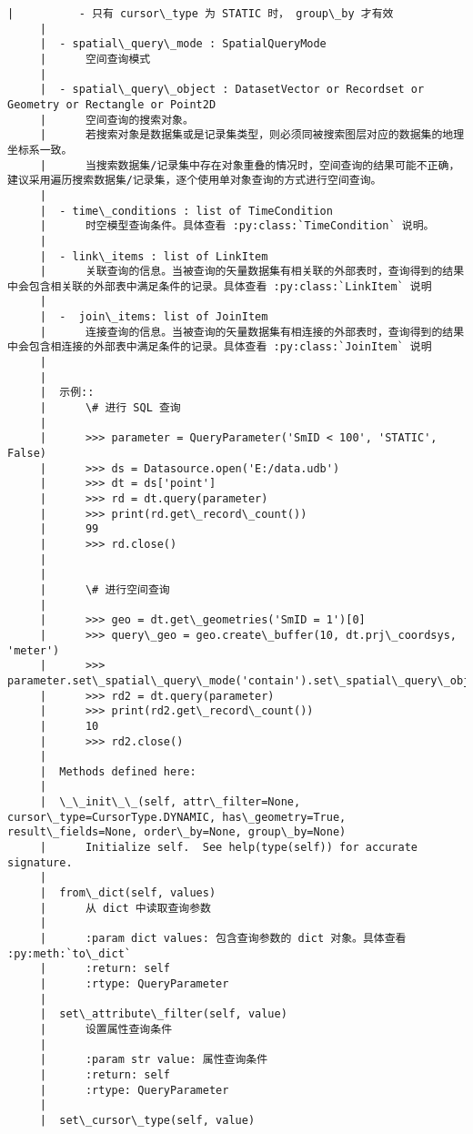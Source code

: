 \documentclass[11pt]{article}
\begin{document}
\begin{Verbatim}[commandchars=\\\{\}]
     |          - 只有 cursor\_type 为 STATIC 时， group\_by 才有效
     |  
     |  - spatial\_query\_mode : SpatialQueryMode
     |      空间查询模式
     |  
     |  - spatial\_query\_object : DatasetVector or Recordset or Geometry or Rectangle or Point2D
     |      空间查询的搜索对象。
     |      若搜索对象是数据集或是记录集类型，则必须同被搜索图层对应的数据集的地理坐标系一致。
     |      当搜索数据集/记录集中存在对象重叠的情况时，空间查询的结果可能不正确，建议采用遍历搜索数据集/记录集，逐个使用单对象查询的方式进行空间查询。
     |  
     |  - time\_conditions : list of TimeCondition
     |      时空模型查询条件。具体查看 :py:class:`TimeCondition` 说明。
     |  
     |  - link\_items : list of LinkItem
     |      关联查询的信息。当被查询的矢量数据集有相关联的外部表时，查询得到的结果中会包含相关联的外部表中满足条件的记录。具体查看 :py:class:`LinkItem` 说明
     |  
     |  -  join\_items: list of JoinItem
     |      连接查询的信息。当被查询的矢量数据集有相连接的外部表时，查询得到的结果中会包含相连接的外部表中满足条件的记录。具体查看 :py:class:`JoinItem` 说明
     |  
     |  
     |  示例::
     |      \# 进行 SQL 查询
     |  
     |      >>> parameter = QueryParameter('SmID < 100', 'STATIC', False)
     |      >>> ds = Datasource.open('E:/data.udb')
     |      >>> dt = ds['point']
     |      >>> rd = dt.query(parameter)
     |      >>> print(rd.get\_record\_count())
     |      99
     |      >>> rd.close()
     |  
     |  
     |      \# 进行空间查询
     |  
     |      >>> geo = dt.get\_geometries('SmID = 1')[0]
     |      >>> query\_geo = geo.create\_buffer(10, dt.prj\_coordsys, 'meter')
     |      >>> parameter.set\_spatial\_query\_mode('contain').set\_spatial\_query\_object(query\_geo)
     |      >>> rd2 = dt.query(parameter)
     |      >>> print(rd2.get\_record\_count())
     |      10
     |      >>> rd2.close()
     |  
     |  Methods defined here:
     |  
     |  \_\_init\_\_(self, attr\_filter=None, cursor\_type=CursorType.DYNAMIC, has\_geometry=True, result\_fields=None, order\_by=None, group\_by=None)
     |      Initialize self.  See help(type(self)) for accurate signature.
     |  
     |  from\_dict(self, values)
     |      从 dict 中读取查询参数
     |      
     |      :param dict values: 包含查询参数的 dict 对象。具体查看 :py:meth:`to\_dict`
     |      :return: self
     |      :rtype: QueryParameter
     |  
     |  set\_attribute\_filter(self, value)
     |      设置属性查询条件
     |      
     |      :param str value: 属性查询条件
     |      :return: self
     |      :rtype: QueryParameter
     |  
     |  set\_cursor\_type(self, value)

\end{Verbatim}
\end{document}
